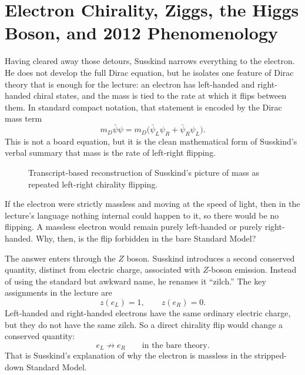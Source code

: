 \section{Electron Chirality, Ziggs, the Higgs Boson, and 2012 Phenomenology}

Having cleared away those detours, Susskind narrows everything to the electron. He does not develop the full Dirac equation, but he isolates one feature of Dirac theory that is enough for the lecture: an electron has left-handed and right-handed chiral states, and the mass is tied to the rate at which it flips between them. In standard compact notation, that statement is encoded by the Dirac mass term
\begin{equation}
m_{D}\bar\psi\psi
=
m_{D}\bigl(\bar\psi_{L}\psi_{R}+\bar\psi_{R}\psi_{L}\bigr).
\end{equation}
This is not a board equation, but it is the clean mathematical form of Susskind's verbal summary that mass is the rate of left-right flipping.

\begin{figure}
\centering
{}
\caption{Transcript-based reconstruction of Susskind's picture of mass as repeated left-right chirality flipping.}
\end{figure}

If the electron were strictly massless and moving at the speed of light, then in the lecture's language nothing internal could happen to it, so there would be no flipping. A massless electron would remain purely left-handed or purely right-handed. Why, then, is the flip forbidden in the bare Standard Model?

The answer enters through the \(Z\) boson. Susskind introduces a second conserved quantity, distinct from electric charge, associated with \(Z\)-boson emission. Instead of using the standard but awkward name, he renames it ``zilch.'' The key assignments in the lecture are
\begin{equation}
z(e_{L})=1,\qquad z(e_{R})=0.
\end{equation}
Left-handed and right-handed electrons have the same ordinary electric charge, but they do not have the same zilch. So a direct chirality flip would change a conserved quantity:
\begin{equation}
e_{L}\not\to e_{R}\qquad \text{in the bare theory.}
\end{equation}
That is Susskind's explanation of why the electron is massless in the stripped-down Standard Model.

